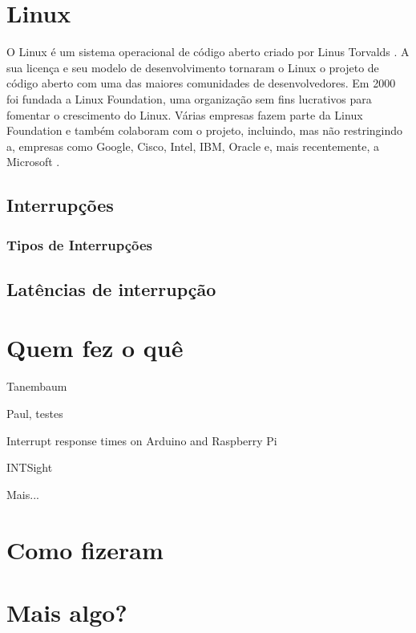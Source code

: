 \section{Linux}

O Linux é um sistema operacional de código aberto criado por Linus Torvalds \cite{Linux}. A sua licença e seu modelo de desenvolvimento tornaram o Linux o projeto de código aberto com uma das maiores comunidades de desenvolvedores. Em 2000 foi fundada a Linux Foundation, uma organização sem fins lucrativos para fomentar o crescimento do Linux. Várias empresas fazem parte da Linux Foundation e também colaboram com o projeto, incluindo, mas não restringindo a, empresas como Google, Cisco, Intel, IBM, Oracle e, mais recentemente, a Microsoft \cite{LinuxFoundation}. 

\subsection{Interrupções}


\subsubsection{Tipos de Interrupções}
\subsection{Latências de interrupção}

\section{Quem fez o quê}

Tanembaum \cite{Tanenbaum2016}

Paul, testes \cite{Regnier2008}

Interrupt response times on Arduino and Raspberry Pi \cite{Solc2016}

INTSight \cite{Gerhorst2018}

Mais...

\section{Como fizeram}
\section{Mais algo?}